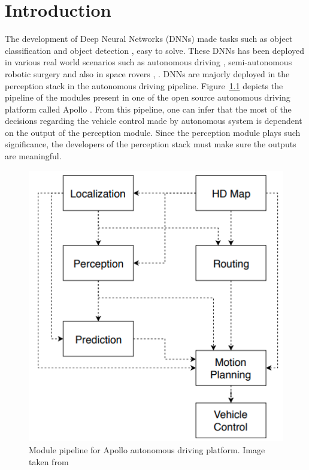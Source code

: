 

    \chapter{Introduction}

The development of Deep Neural Networks (DNNs) made tasks such as object classification \cite{alexnet} and object detection \cite{fasterrcnn}, \cite{fastrcnn} easy to solve.
These DNNs has been deployed in various real world scenarios such as autonomous driving \cite{autonomousdriving}, semi-autonomous robotic surgery \cite{roboticsurgery} and also in space rovers \cite{Marsrover_1}, \cite{Marsrover_2}.
DNNs are majorly deployed in the perception stack in the autonomous driving pipeline. 
Figure~\ref{fig:Apollopipeline} depicts the pipeline of the modules present in one of the open source autonomous driving platform called Apollo \cite{baiduapollo}.
From this pipeline, one can infer that the most of the decisions regarding the vehicle control made by autonomous system is dependent on the output of the perception module.
Since the perception module plays such significance, the developers of the perception stack must make sure the outputs are meaningful.
\begin{figure}[h!]
    \centering
    \includegraphics[scale=0.35]{images/Apollopipeline.png}
    \caption{Module pipeline for Apollo autonomous driving platform. Image taken from \cite{baiduapollo}}
    \label{fig:Apollopipeline}
\end{figure}

